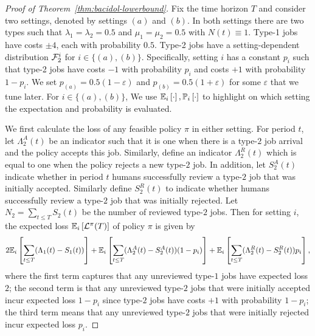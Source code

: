 \begin{proof}[Proof of Theorem~\ref{thm:bacidol-lowerbound}]
Fix the time horizon $T$ and consider two settings, denoted by settings $(a)$ and $(b)$. In both settings there are two types such that $\lambda_1 = \lambda_2 = 0.5$ and $\mu_1 = \mu_2 = 0.5$ with $N(t) \equiv 1$. Type-1 jobs have costs $\pm 4$, each with probability $0.5$. Type-2 jobs have a setting-dependent distribution $\mathcal{F}_2^{i}$ for $i \in \{(a),(b)\}$. Specifically, setting $i$ has a constant $p_i$ such that type-2 jobs have costs $-1$ with probability $p_{i}$ and costs $+1$ with probability $1-p_i$. We set $p_{(a)} = 0.5(1-\varepsilon)$ and $p_{(b)}=0.5(1+\varepsilon)$ for some $\varepsilon$ that we tune later. For $i \in \{(a),(b)\}$, We use $\mathbb E_{i}\left[\cdot\right], \mathbb P_{i}\left[\cdot\right]$ to highlight on which setting the expectation and probability is evaluated.

We first calculate the loss of any feasible policy $\pi$ in either setting. For period $t$, let $\Lambda_2^A(t)$ be an indicator such that it is one when there is a type-$2$ job arrival and the policy accepts this job. Similarly, define an indicator $\Lambda_2^R(t)$ which is equal to one when the policy rejects a new type-$2$ job. In addition, let $S_2^A(t)$ indicate whether in period $t$ humans successfully review a type-$2$ job that was initially accepted. Similarly define $S_2^R(t)$ to indicate whether humans successfully review a type-$2$ job that was initially rejected. Let $N_2 = \sum_{t \leq T} S_2(t)$ be the number of reviewed type-$2$ jobs. Then for setting $i$, the expected loss $\mathbb E_{i}\left[\mathcal{L}^{\pi}(T)\right]$ of policy $\pi$ is given by 
\[
2\mathbb E_{i}\left[\sum_{t\leq T} (\Lambda_1(t)-S_1(t))\right] + \mathbb E_{i}\left[\sum_{t\leq T} (\Lambda_2^A(t) - S_2^A(t))(1-p_i)\right] + \mathbb E_{i}\left[\sum_{t\leq T} (\Lambda_2^R(t) - S_2^R(t))p_i\right], 
\]
where the first term captures that any unreviewed type-$1$ jobs have expected loss $2$; the second term is that any unreviewed type-$2$ jobs that were initially accepted incur expected loss $1 - p_i$ since type-$2$ jobs have costs $+1$ with probability $1-p_i$; the third term means that any unreviewed type-$2$ jobs that were initially rejected incur expected loss $p_i$.


\end{proof}
